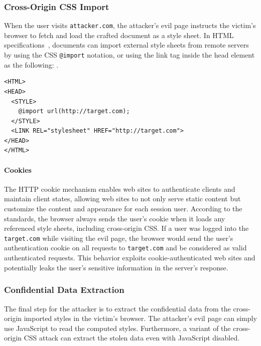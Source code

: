 \documentclass{acm_proc_article-sp}
\begin{document}
\subsubsection{Cross-Origin CSS Import}
When the user visits \texttt{attacker.com}, the attacker's evil page instructs the victim's browser to fetch and load the crafted document as a style sheet. In HTML specifications~\cite{html}, documents can import external style sheets from remote servers by using the CSS \texttt{@import} notation, or using the link tag inside the head element as the following: .
\begin{verbatim}
<HTML>
<HEAD>
  <STYLE>
    @import url(http://target.com);
  </STYLE>
  <LINK REL="stylesheet" HREF="http://target.com">
</HEAD>
</HTML>
\end{verbatim}
\paragraph{Cookies}
The HTTP cookie mechanism enables web sites to authenticate clients and maintain client states, allowing web sites to not only serve static content but customize the content and appearance for each session user. According to the standards, the browser always sends the user's cookie when it loads any referenced style sheets, including cross-origin CSS. If a user was logged into the \texttt{target.com} while visiting the evil page, the browser would send the user's authentication cookie on all requests to \texttt{target.com} and be considered as valid authenticated requests. This behavior exploits cookie-authenticated web sites and potentially leaks the user's sensitive information in the server's response.

\subsubsection{Confidential Data Extraction}
The final step for the attacker is to extract the confidential data from the cross-origin imported styles in the victim's browser. The attacker's evil page can simply use JavaScript to read the computed styles. Furthermore, a variant of the cross-origin CSS attack
can extract the stolen data even with JavaScript disabled.
\end{document}
